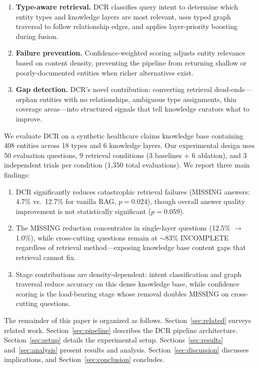 \documentclass[11pt,a4paper]{article}
\begin{document}
\begin{enumerate}[nosep]
  \item \textbf{Type-aware retrieval.} DCR classifies query intent to determine which entity types and knowledge layers are most relevant, uses typed graph traversal to follow relationship edges, and applies layer-priority boosting during fusion.
  \item \textbf{Failure prevention.} Confidence-weighted scoring adjusts entity relevance based on content density, preventing the pipeline from returning shallow or poorly-documented entities when richer alternatives exist.
  \item \textbf{Gap detection.} DCR's novel contribution: converting retrieval dead-ends---orphan entities with no relationships, ambiguous type assignments, thin coverage areas---into structured signals that tell knowledge curators what to improve.
\end{enumerate}

We evaluate DCR on a synthetic healthcare claims knowledge base containing 408 entities across 18 types and 6 knowledge layers. Our experimental design uses 50 evaluation questions, 9 retrieval conditions (3 baselines + 6 ablation), and 3 independent trials per condition (1,350 total evaluations). We report three main findings:

\begin{enumerate}[nosep]
  \item DCR significantly reduces catastrophic retrieval failures (MISSING answers: 4.7\% vs.\ 12.7\% for vanilla RAG, $p = 0.024$), though overall answer quality improvement is not statistically significant ($p = 0.059$).
  \item The MISSING reduction concentrates in single-layer questions (12.5\% $\to$ 1.0\%), while cross-cutting questions remain at $\sim$83\% INCOMPLETE regardless of retrieval method---exposing knowledge base content gaps that retrieval cannot fix.
  \item Stage contributions are density-dependent: intent classification and graph traversal reduce accuracy on this dense knowledge base, while confidence scoring is the load-bearing stage whose removal doubles MISSING on cross-cutting questions.
\end{enumerate}

The remainder of this paper is organized as follows. Section~\ref{sec:related} surveys related work. Section~\ref{sec:pipeline} describes the DCR pipeline architecture. Section~\ref{sec:setup} details the experimental setup. Sections~\ref{sec:results} and~\ref{sec:analysis} present results and analysis. Section~\ref{sec:discussion} discusses implications, and Section~\ref{sec:conclusion} concludes.
\end{document}
